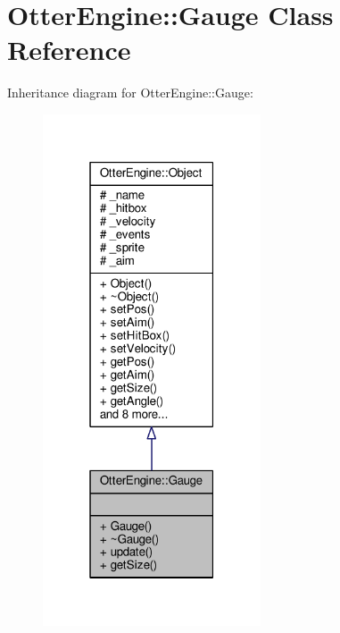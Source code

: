 \hypertarget{class_otter_engine_1_1_gauge}{}\section{Otter\+Engine\+:\+:Gauge Class Reference}
\label{class_otter_engine_1_1_gauge}


Inheritance diagram for Otter\+Engine\+:\+:Gauge\+:\nopagebreak
\begin{figure}[H]
\begin{center}
\leavevmode
\includegraphics[width=183pt]{d1/d7c/class_otter_engine_1_1_gauge__inherit__graph}
\end{center}
\end{figure}


